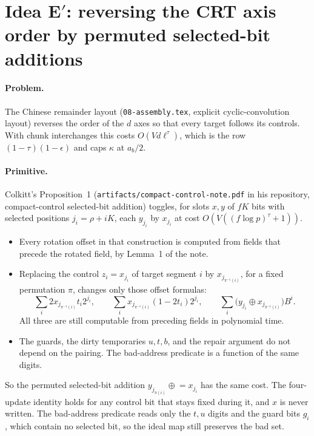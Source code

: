 \documentclass[11pt]{article}
\theoremstyle{remark}\newtheorem*{remark}{Remark}
\begin{document}
\section{Idea E$'$: reversing the CRT axis order by permuted selected-bit additions}

\paragraph{Problem.} The Chinese remainder layout (\texttt{08-assembly.tex}, explicit
cyclic-convolution layout) reverses the order of the $d$ axes so that every target follows
its controls. With chunk interchanges this costs $O(Vd\ell^\tau)$, which is the row
$(1-\tau)(1-\epsilon)$ and caps $\kappa$ at $a_b/2$.

\paragraph{Primitive.} Colkitt's Proposition~1 (\texttt{artifacts/compact-control-note.pdf} in his repository,
compact-control selected-bit addition) toggles, for slots $x,y$ of $fK$ bits with selected
positions $j_i=\rho+iK$, each $y_{j_i}$ by $x_{j_i}$ at cost $O(V((f\log p)^\tau+1))$.
\begin{itemize}
\item Every rotation offset in that construction is computed from fields that precede the
rotated field, by Lemma~1 of the note.
\item Replacing the control $z_i=x_{j_i}$ of target segment $i$ by $x_{j_{\pi^{-1}(i)}}$, for a
fixed permutation $\pi$, changes only those offset formulas:
\[
 \sum_i2x_{j_{\pi^{-1}(i)}}t_i2^{j_i},\qquad
 \sum_ix_{j_{\pi^{-1}(i)}}(1-2t_i)2^{j_i},\qquad
 \sum_i\bigl(y_{j_i}\oplus x_{j_{\pi^{-1}(i)}}\bigr)B^i .
\]
All three are still computable from preceding fields in polynomial time.
\item The guards, the dirty temporaries $u,t,b$, and the repair argument do not depend on the
pairing. The bad-address predicate is a function of the same digits.
\end{itemize}
So the permuted selected-bit addition $y_{j_{\pi(i)}}\mathrel{\oplus}=x_{j_i}$ has the same cost. The four-update identity holds for any control bit that stays fixed during it, and $x$ is never written. The bad-address predicate reads only the $t,u$ digits and the guard bits $g_i$, which contain no selected bit, so the ideal map still preserves the bad set.
\end{document}
